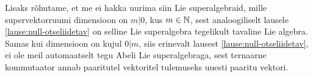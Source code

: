 Lisaks rõhutame, et me ei hakka uurima siin Lie superalgebraid,
mille supervektorruumi dimensioon on $m|0$, kus $m \in \mathbb{N}$, sest
analoogiliselt lausele \ref{lause:null-otseliidetav} on selline Lie
superalgebra tegelikult tavaline Lie algebra. Samas kui dimensioon on
kujul $0|m$, siis erinevalt lausest \ref{lause:null-otseliidetav}, ei ole
meil automaatselt tegu Abeli Lie superalgebraga, sest ternaarne kommutaator
annab paaritutel vektoritel tulemuseks uuesti paaritu vektori.
